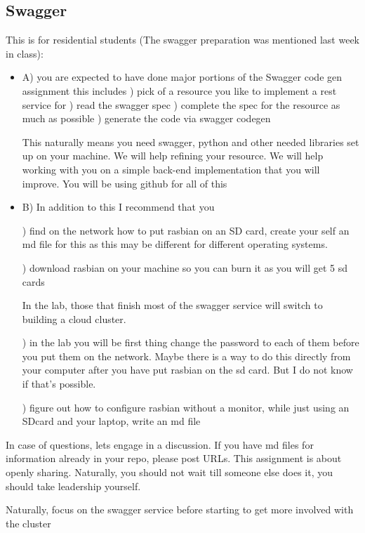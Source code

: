 \subsection{Swagger}
\begin{exercise}
This is for residential students (The swagger preparation was mentioned last week in class):
 \begin{itemize}
\item A) you are expected to have done major portions of the Swagger code gen assignment this includes
) pick of a resource you like to implement a rest service for 
) read the swagger spec
) complete the spec for the resource as much as possible
) generate the code via swagger codegen
 
This naturally means you need swagger, python and other needed libraries set up on your machine. We will help refining your resource. We will help working with you on a simple back-end implementation that you will improve. You will be using github for all of this
\smallskip
\item B) In addition to this I recommend that you 
 
) find on the network how to put rasbian on an SD card, create your self an md file for this as this may be different for different operating systems.
 
) download rasbian on your machine so you can burn it as you will get 5 sd cards
 
In the lab, those that finish most of the swagger service will switch to building a cloud cluster.
 
) in the lab you will be first thing change the password to each of them before you put them on the network. Maybe there is a way to do this directly from your computer after you have put rasbian on the sd card. But I do not know if that's possible.
 
) figure out how to configure rasbian without a monitor, while just using an SDcard and your laptop, write an md file

 \end{itemize}
 
In case of questions, lets engage in a discussion. If you have md files for information already in your repo, please post URLs. This assignment is about openly sharing. Naturally, you should not wait till someone else does it, you should take leadership yourself.
 
Naturally, focus on the swagger service before starting to get more involved with the cluster
\end{exercise}

